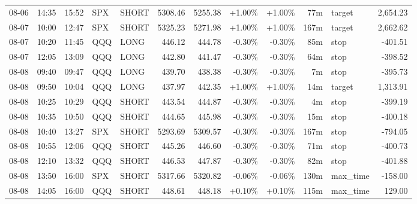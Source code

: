 \documentclass[11pt,a4paper]{article}
\begin{document}
\begin{center}
\begin{longtable}{>{\color{txtmain}}l l l l l r r r r r >{\color{txtmain}}l r}
08-06 & 14:35 & 15:52 & SPX & SHORT & 5308.46 & 5255.38 & \textcolor{wingreen}{+1.00\%} & \textcolor{wingreen}{+1.00\%} & 77m & target & \textcolor{wingreen}{2,654.23} \\
08-07 & 10:00 & 12:47 & SPX & SHORT & 5325.23 & 5271.98 & \textcolor{wingreen}{+1.00\%} & \textcolor{wingreen}{+1.00\%} & 167m & target & \textcolor{wingreen}{2,662.62} \\
08-07 & 10:20 & 11:45 & QQQ & LONG & 446.12 & 444.78 & \textcolor{lossred}{-0.30\%} & \textcolor{lossred}{-0.30\%} & 85m & stop & \textcolor{lossred}{-401.51} \\
08-07 & 12:05 & 13:09 & QQQ & LONG & 442.80 & 441.47 & \textcolor{lossred}{-0.30\%} & \textcolor{lossred}{-0.30\%} & 64m & stop & \textcolor{lossred}{-398.52} \\
08-08 & 09:40 & 09:47 & QQQ & LONG & 439.70 & 438.38 & \textcolor{lossred}{-0.30\%} & \textcolor{lossred}{-0.30\%} & 7m & stop & \textcolor{lossred}{-395.73} \\
08-08 & 09:50 & 10:04 & QQQ & LONG & 437.97 & 442.35 & \textcolor{wingreen}{+1.00\%} & \textcolor{wingreen}{+1.00\%} & 14m & target & \textcolor{wingreen}{1,313.91} \\
08-08 & 10:25 & 10:29 & QQQ & SHORT & 443.54 & 444.87 & \textcolor{lossred}{-0.30\%} & \textcolor{lossred}{-0.30\%} & 4m & stop & \textcolor{lossred}{-399.19} \\
08-08 & 10:35 & 10:50 & QQQ & SHORT & 444.65 & 445.98 & \textcolor{lossred}{-0.30\%} & \textcolor{lossred}{-0.30\%} & 15m & stop & \textcolor{lossred}{-400.18} \\
08-08 & 10:40 & 13:27 & SPX & SHORT & 5293.69 & 5309.57 & \textcolor{lossred}{-0.30\%} & \textcolor{lossred}{-0.30\%} & 167m & stop & \textcolor{lossred}{-794.05} \\
08-08 & 10:55 & 12:06 & QQQ & SHORT & 445.26 & 446.60 & \textcolor{lossred}{-0.30\%} & \textcolor{lossred}{-0.30\%} & 71m & stop & \textcolor{lossred}{-400.73} \\
08-08 & 12:10 & 13:32 & QQQ & SHORT & 446.53 & 447.87 & \textcolor{lossred}{-0.30\%} & \textcolor{lossred}{-0.30\%} & 82m & stop & \textcolor{lossred}{-401.88} \\
08-08 & 13:50 & 16:00 & SPX & SHORT & 5317.66 & 5320.82 & \textcolor{lossred}{-0.06\%} & \textcolor{lossred}{-0.06\%} & 130m & max\_time & \textcolor{lossred}{-158.00} \\
08-08 & 14:05 & 16:00 & QQQ & SHORT & 448.61 & 448.18 & \textcolor{wingreen}{+0.10\%} & \textcolor{wingreen}{+0.10\%} & 115m & max\_time & \textcolor{wingreen}{129.00} \\

\end{longtable}
\end{center}
\end{document}
